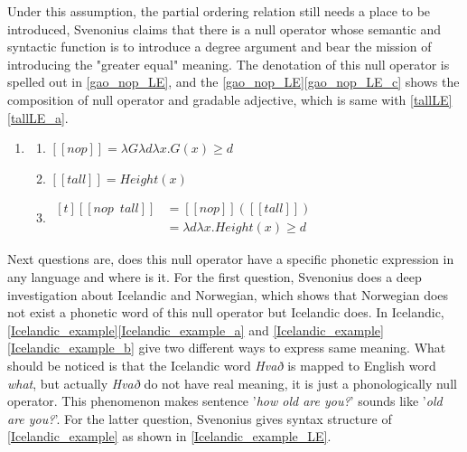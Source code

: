 \documentclass{ctexart}
\begin{document}
Under this assumption, the partial ordering relation still needs a place to be introduced, Svenonius claims that there is a null operator whose semantic and syntactic function is to introduce a degree argument and bear the mission of introducing the "greater equal" meaning. The denotation of this null operator is spelled out in \ref{gao_nop_LE}, and the \ref{gao_nop_LE}\ref{gao_nop_LE_c} shows the composition of null operator and gradable adjective, which is same with \ref{tallLE}\ref{tallLE_a}.

\begin{enumerate}[resume]
    \item \label{gao_nop_LE}

    \begin{enumerate}
        \item \label{gao_nop_LE_a} 
        $[\![nop]\!]=\lambda G\lambda d \lambda x.G(x) \geq d$

        \item \label{gao_nop_LE_b} 
        $[\![tall]\!]=Height(x)$

        \item \label{gao_nop_LE_c} 
        $\begin{aligned}[t]
            [\![nop \enspace tall]\!] &= [\![nop]\!]([\![tall]\!]) \\
            &= \lambda d \lambda x.Height(x) \geq d
        \end{aligned}$

    \end{enumerate}
\end{enumerate}

Next questions are, does this null operator have a specific phonetic expression in any language and where is it. For the first question, Svenonius does a deep investigation about Icelandic and Norwegian, which shows that Norwegian does not exist a phonetic word of this null operator but Icelandic does. In Icelandic, \ref{Icelandic_example}\ref{Icelandic_example_a} and \ref{Icelandic_example}\ref{Icelandic_example_b} give two different ways to express same meaning. What should be noticed is that the Icelandic word \textit{Hvað} is mapped to English word \textit{what}, but actually \textit{Hvað} do not have real meaning, it is just a phonologically null operator. This phenomenon makes sentence '\textit{how old are you?}' sounds like '\textit{old are you?}'. For the latter question, Svenonius gives syntax structure of \ref{Icelandic_example} as shown in \ref{Icelandic_example_LE}. 
\end{document}

